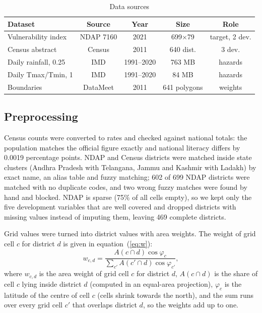 \documentclass[conference]{IEEEtran}
\begin{document}
\begin{table}[!htb]
\centering
\caption{Data sources}
\label{tab:data}
\scriptsize
\setlength{\tabcolsep}{3.5pt}
\begin{tabular}{lcccc}
\toprule
Dataset & Source & Year & Size & Role \\
\midrule
Vulnerability index & NDAP 7160 & 2021 & 699$\times$79 & target, 2 dev. \\
Census abstract & Census & 2011 & 640 dist. & 3 dev. \\
Daily rainfall, 0.25\textdegree{} & IMD & 1991--2020 & 763 MB & hazards \\
Daily Tmax/Tmin, 1\textdegree{} & IMD & 1991--2020 & 84 MB & hazards \\
Boundaries & DataMeet & 2011 & 641 polygons & weights \\
\bottomrule
\end{tabular}
\end{table}

\subsection{Preprocessing}
Census counts were converted to rates and checked against national totals: the population matches the official figure exactly and national literacy differs by 0.0019 percentage points. NDAP and Census districts were matched inside state clusters (Andhra Pradesh with Telangana, Jammu and Kashmir with Ladakh) by exact name, an alias table and fuzzy matching; 602 of 699 NDAP districts were matched with no duplicate codes, and two wrong fuzzy matches were found by hand and blocked. NDAP is sparse (75\% of all cells empty), so we kept only the five development variables that are well covered and dropped districts with missing values instead of imputing them, leaving 469 complete districts.

Grid values were turned into district values with area weights. The weight of grid cell $c$ for district $d$ is given in equation~(\ref{eq:w}):
\begin{equation}\label{eq:w}
w_{c,d} = \frac{A(c \cap d)\cos\varphi_c}{\sum_{c'} A(c' \cap d)\cos\varphi_{c'}},
\end{equation}
\noindent where $w_{c,d}$ is the area weight of grid cell $c$ for district $d$, $A(c \cap d)$ is the share of cell $c$ lying inside district $d$ (computed in an equal-area projection), $\varphi_c$ is the latitude of the centre of cell $c$ (cells shrink towards the north), and the sum runs over every grid cell $c'$ that overlaps district $d$, so the weights add up to one.
\end{document}
